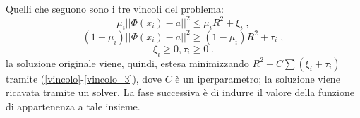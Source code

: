 \documentclass[12pt]{report}
\theoremstyle{definition}
\begin{document}
\\
Quelli che seguono sono i tre vincoli del problema:
\begin{equation}\label{vincolo}
    \mu_i || \mathit{\Phi}(x_i) - a ||^2 \leq \mu_iR^2 + \xi_i \;,
\end{equation}
\begin{equation}\label{vincolo_2}
    (1 - \mu_i) || \mathit{\Phi}(x_i) - a ||^2 \geq (1 - \mu_i)R^2 + \tau_i \;,
\end{equation}
\begin{equation}\label{vincolo_3}
    \xi_i \geq 0, \tau_i \geq 0 \;.
\end{equation}
la soluzione originale viene, quindi, estesa minimizzando $R^2 + C\sum(\xi_i + \tau_i)$ tramite (\ref{vincolo}-\ref{vincolo_3}), dove $C$ è un iperparametro; la soluzione viene ricavata tramite un solver.
La fase successiva è di indurre il valore della funzione di appartenenza a tale insieme.
\end{document}

